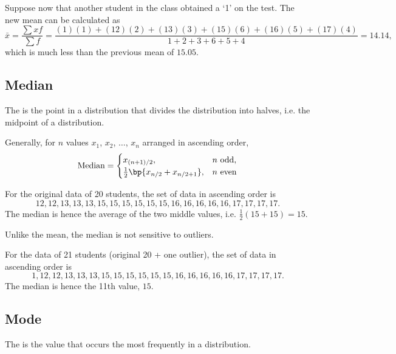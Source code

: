 \begin{example}
    Suppose now that another student in the class obtained a `1' on the test. The new mean can be calculated as \[\bar{x} = \frac{\sum xf}{\sum f} = \frac{(1)(1) + (12)(2) + (13)(3) + (15)(6) + (16)(5) + (17)(4)}{1 + 2 + 3 + 6 + 5 + 4} = 14.14,\] which is much less than the previous mean of $15.05$. 
\end{example}

\subsection{Median}

\begin{definition}
    The  is the point in a distribution that divides the distribution into halves, i.e. the midpoint of a distribution.
\end{definition}

Generally, for $n$ values $x_1$, $x_2$, $\dots$, $x_n$ arranged in ascending order, \[\text{Median} = \begin{cases}
    x_{(n+1)/2}, & \text{$n$ odd},\\
    \frac12 \bp{x_{n/2} + x_{n/2 + 1}}, & \text{$n$ even}
\end{cases}\]

\begin{example}
    For the original data of 20 students, the set of data in ascending order is \[12, 12, 13, 13, 13, 15, 15, 15, 15, 15, 15, 16, 16, 16, 16, 16, 17, 17, 17, 17.\] The median is hence the average of the two middle values, i.e. $\frac12 (15 + 15) = 15$.
\end{example}

Unlike the mean, the median is not sensitive to outliers.

\begin{example}
    For the data of 21 students (original 20 + one outlier), the set of data in ascending order is \[1, 12, 12, 13, 13, 13, 15, 15, 15, 15, 15, 15, 16, 16, 16, 16, 16, 17, 17, 17, 17.\] The median is hence the 11th value, $15$.
\end{example}

\subsection{Mode}

\begin{definition}
    The  is the value that occurs the most frequently in a distribution.
\end{definition}

